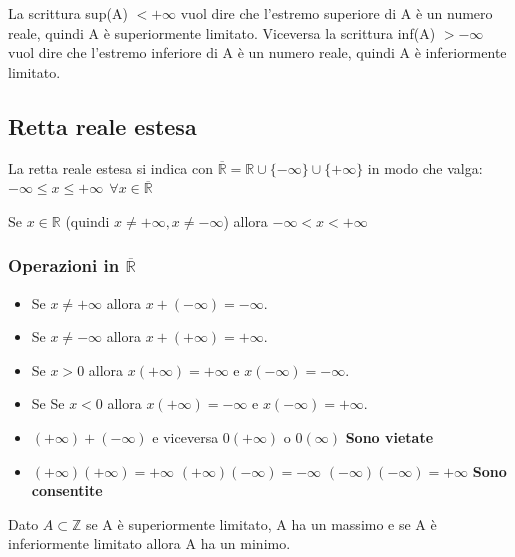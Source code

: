 \begin{observation}
    La scrittura sup(A) $< +\infty$ vuol dire che l'estremo superiore di A è un numero reale, quindi A è superiormente limitato. Viceversa la scrittura inf(A) $> -\infty$ vuol dire che l'estremo inferiore di A è un numero reale, quindi A è inferiormente limitato.
\end{observation}

\subsection{Retta reale estesa}
\begin{definition}
    La retta reale estesa si indica con $\overline{\mathbb{R}} = \mathbb{R} \cup \{-\infty\} \cup \{+\infty\}$ in modo che valga: $-\infty \leq x \leq +\infty \: \: \forall x \in \overline{\mathbb{R}}$
\end{definition}
\begin{observation}
    Se $x \in \mathbb{R}$ (quindi $x \neq +\infty, x \neq -\infty$) allora $-\infty < x < +\infty$
\end{observation}

\subsubsection{Operazioni in $\overline{\mathbb{R}}$}
\begin{itemize}
    \item Se $x \neq +\infty$ allora $x + (-\infty) = -\infty$.
    \item Se $x \neq -\infty$ allora $x + (+\infty) = +\infty$.
    \item Se $x > 0$ allora $x(+\infty) = +\infty$ e $x(-\infty) = -\infty$.
    \item Se Se $x < 0$ allora $x(+\infty) = -\infty$ e $x(-\infty) = +\infty$.
    \item $(+\infty) + (-\infty)$ e viceversa \hspace{.3cm} $0(+\infty)$ o $0(\infty)$ \hspace{.3cm}\textbf{Sono vietate}
    \item $(+\infty)(+\infty) = +\infty$ \hspace{.2cm} $(+\infty)(-\infty) = -\infty$ \hspace{.2cm} $(-\infty)(-\infty) = +\infty$ \hspace{.2cm} \textbf{Sono consentite}
\end{itemize}
\begin{observation}
    Dato $A \subset \mathbb{Z}$ se A è superiormente limitato, A ha un massimo e se A è inferiormente limitato allora A ha un minimo.
\end{observation}

